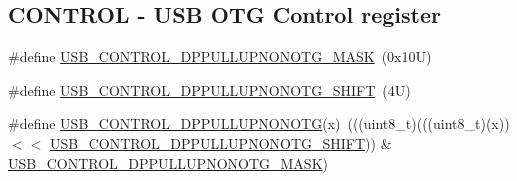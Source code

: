 \subsection*{C\+O\+N\+T\+R\+OL -\/ U\+SB O\+TG Control register}
\begin{DoxyCompactItemize}
\item 
\#define \mbox{\hyperlink{group___u_s_b___register___masks_ga764d9d972859eeded5e092a77eb4de79}{U\+S\+B\+\_\+\+C\+O\+N\+T\+R\+O\+L\+\_\+\+D\+P\+P\+U\+L\+L\+U\+P\+N\+O\+N\+O\+T\+G\+\_\+\+M\+A\+SK}}~(0x10\+U)
\item 
\#define \mbox{\hyperlink{group___u_s_b___register___masks_ga5bae9683a5ae7c48617b8d24a35786ce}{U\+S\+B\+\_\+\+C\+O\+N\+T\+R\+O\+L\+\_\+\+D\+P\+P\+U\+L\+L\+U\+P\+N\+O\+N\+O\+T\+G\+\_\+\+S\+H\+I\+FT}}~(4\+U)
\item 
\#define \mbox{\hyperlink{group___u_s_b___register___masks_gae22b0aee8222ab7dd6f06db5ab401558}{U\+S\+B\+\_\+\+C\+O\+N\+T\+R\+O\+L\+\_\+\+D\+P\+P\+U\+L\+L\+U\+P\+N\+O\+N\+O\+TG}}(x)~(((uint8\+\_\+t)(((uint8\+\_\+t)(x)) $<$$<$ \mbox{\hyperlink{group___u_s_b___register___masks_ga5bae9683a5ae7c48617b8d24a35786ce}{U\+S\+B\+\_\+\+C\+O\+N\+T\+R\+O\+L\+\_\+\+D\+P\+P\+U\+L\+L\+U\+P\+N\+O\+N\+O\+T\+G\+\_\+\+S\+H\+I\+FT}})) \& \mbox{\hyperlink{group___u_s_b___register___masks_ga764d9d972859eeded5e092a77eb4de79}{U\+S\+B\+\_\+\+C\+O\+N\+T\+R\+O\+L\+\_\+\+D\+P\+P\+U\+L\+L\+U\+P\+N\+O\+N\+O\+T\+G\+\_\+\+M\+A\+SK}})
\end{DoxyCompactItemize}
